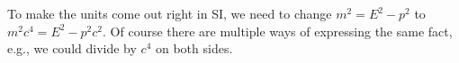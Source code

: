 To make the units come out right in SI, we need to change
$m^2 = E^2-p^2$ to $m^2c^4=E^2-p^2c^2$. Of course there are
multiple ways of expressing the same fact, e.g., we could divide
by $c^4$ on both sides.
